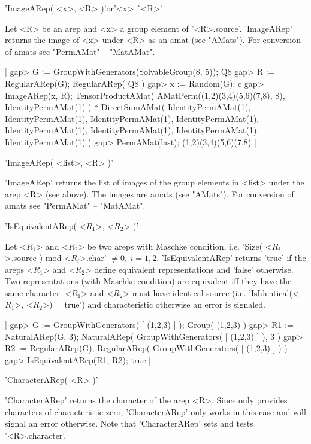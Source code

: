 'ImageARep( <x>, <R> )'\quad or\quad'<x> \^\ <R>'

Let <R> be an arep and <x> a group element of '<R>.source'.
'ImageARep' returns the image of <x> under <R> as an amat 
(see "AMats"). For conversion of amats see "PermAMat" -- "MatAMat".

|    gap> G := GroupWithGenerators(SolvableGroup(8, 5));
    Q8
    gap> R := RegularARep(G);
    RegularARep( Q8 )
    gap> x := Random(G);
    c
    gap> ImageARep(x, R);
    TensorProductAMat(
      AMatPerm((1,2)(3,4)(5,6)(7,8), 8),
      IdentityPermAMat(1)
    ) *
    DirectSumAMat(
      IdentityPermAMat(1),
      IdentityPermAMat(1),
      IdentityPermAMat(1),
      IdentityPermAMat(1),
      IdentityPermAMat(1),
      IdentityPermAMat(1),
      IdentityPermAMat(1),
      IdentityPermAMat(1)
    )
    gap> PermAMat(last);
    (1,2)(3,4)(5,6)(7,8) |

'ImageARep( <list>, <R> )'

'ImageARep' returns the list of images of the group elements in 
<list> under the arep <R> (see above). The images are amats 
(see "AMats"). For conversion of amats see "PermAMat" -- "MatAMat".


'IsEquivalentARep( <$R_1$>, <$R_2$> )'

Let <$R_1$> and <$R_2$> be two areps with Maschke condition, 
i.e. 'Size( <$R_i$>.source ) mod <$R_i$>.char' $\neq 0,\ i = 1,2$.
'IsEquivalentARep' returns 'true' if the areps <$R_1$> and <$R_2$> 
define equivalent representations and 'false' otherwise. 
Two representations (with Maschke condition) are equivalent iff they 
have the same character.
<$R_1$> and <$R_2$> must have identical source 
(i.e. 'IsIdentical(<$R_1$>, <$R_2$>) = true') 
and characteristic otherwise an error is signaled.

|    gap> G := GroupWithGenerators( [ (1,2,3) ] );
    Group( (1,2,3) )
    gap> R1 := NaturalARep(G, 3);
    NaturalARep( GroupWithGenerators( [ (1,2,3) ] ), 3 )
    gap> R2 := RegularARep(G);
    RegularARep( GroupWithGenerators( [ (1,2,3) ] ) )
    gap> IsEquivalentARep(R1, R2);
    true |


'CharacterARep( <R> )'

'CharacterARep' returns the character of the arep <R>.
Since {\GAP} only provides characters of characteristic
zero, 'CharacterARep' only works in this case and will 
signal an error otherwise.
Note that 'CharacterARep' sets and tests '<R>.character'.

